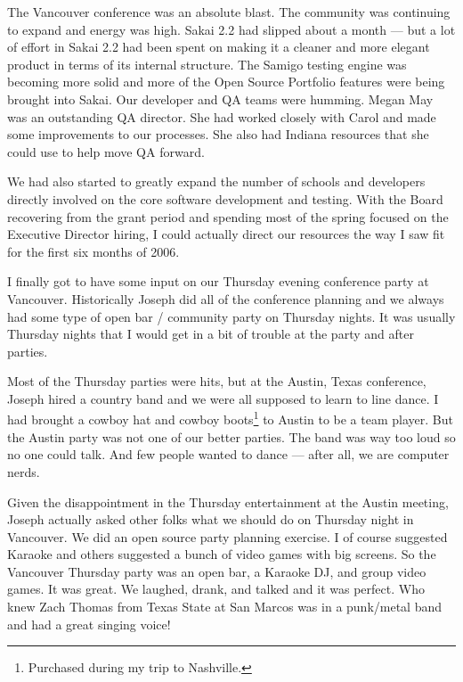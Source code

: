 \documentclass[12pt]{book}
\begin{document}
The Vancouver conference was an absolute blast.  The community was
continuing to expand and energy was high.  Sakai 2.2
had slipped about a month --- but a lot of effort in Sakai 2.2 had been spent on
making it a cleaner and more elegant product in terms of its internal structure.
The Samigo testing engine was becoming more solid and more of the Open Source
Portfolio features were being brought into Sakai.   Our developer and QA teams
were humming.  Megan May was an outstanding QA director.  She had worked closely
with Carol and made some improvements to our processes.  She also had Indiana
resources that she could use to help move QA forward.

We had also started to greatly expand the number of schools and developers directly
involved on the core software development and testing.  With the Board recovering from
the grant period and spending most of the spring focused on
the Executive Director hiring, I could actually
direct our resources the way I saw fit for the first six months of 2006.

I finally got to have some input on our Thursday evening conference party at Vancouver.
Historically Joseph did all of the conference planning and we always had some type
of open bar / community party on Thursday nights.   It was usually Thursday nights
that I would get in a bit
of trouble at the party and after parties.

Most of the Thursday parties were hits, but at the
Austin, Texas conference, Joseph hired a country band and we were all supposed to learn
to line dance.  I had brought a cowboy hat and cowboy boots\footnote{Purchased during my
trip to Nashville.}
to Austin to be a team
player.  But the Austin party was not one of our better parties.
The band was way too loud so no one could talk.   And few people wanted
to dance --- after all, we are computer nerds.

Given the disappointment in the Thursday entertainment at the Austin meeting, Joseph
actually asked other folks what we should do on Thursday night in Vancouver.  We did
an open source party planning exercise.  I of course
suggested Karaoke and others suggested a bunch of video games with big screens.  So the
Vancouver Thursday party was an open bar, a Karaoke DJ, and group video games.  It
was great.   We laughed, drank, and talked and it was perfect.
Who knew Zach Thomas from Texas State at San Marcos was in a punk\slash metal band and had a great singing voice!
\end{document}
